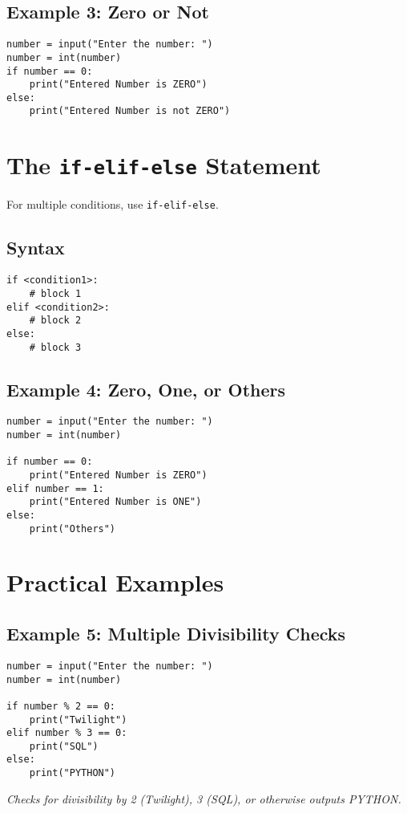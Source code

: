 \subsection*{Example 3: Zero or Not}
\begin{verbatim}
number = input("Enter the number: ")
number = int(number)
if number == 0:
    print("Entered Number is ZERO")
else:
    print("Entered Number is not ZERO")
\end{verbatim}


\section{The \texttt{if-elif-else} Statement}

For multiple conditions, use \texttt{if-elif-else}.

\subsection*{Syntax}
\begin{verbatim}
if <condition1>:
    # block 1
elif <condition2>:
    # block 2
else:
    # block 3
\end{verbatim}

\subsection*{Example 4: Zero, One, or Others}
\begin{verbatim}
number = input("Enter the number: ")
number = int(number)

if number == 0:
    print("Entered Number is ZERO")
elif number == 1:
    print("Entered Number is ONE")
else:
    print("Others")
\end{verbatim}

\section{Practical Examples}

\subsection*{Example 5: Multiple Divisibility Checks}
\begin{verbatim}
number = input("Enter the number: ")
number = int(number)

if number % 2 == 0:
    print("Twilight")
elif number % 3 == 0:
    print("SQL")
else:
    print("PYTHON")
\end{verbatim}
\textit{Checks for divisibility by 2 (Twilight), 3 (SQL), or otherwise outputs PYTHON.}


